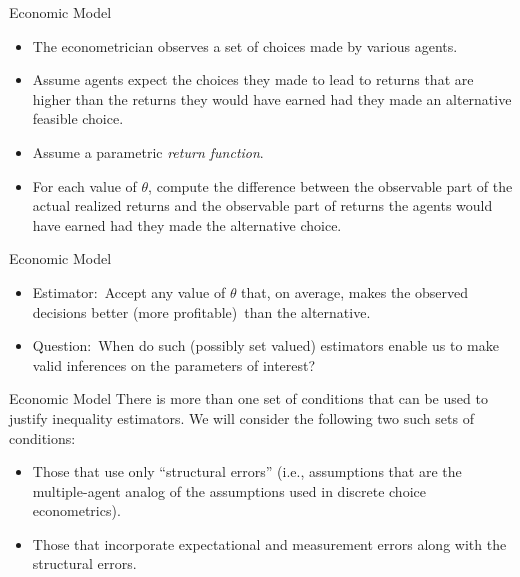 \documentclass[xcolor=pdftex,dvipsnames,table,mathserif]{beamer}
\begin{document}
\begin{frame}{Economic Model}
\begin{itemize}
\item The econometrician observes a set of choices made by various agents.
\vspace{0.1in}
\item Assume agents expect the choices they made to lead to returns that are
higher than the returns they would have earned had they made an
alternative feasible choice.
\vspace{0.1in}
\item Assume a parametric \textit{return function}.
\vspace{0.1in}
\item For each value of $\theta $, compute the difference between the observable part of the actual realized returns and the observable part of returns the agents would have earned had they made the alternative choice.
\end{itemize}
\end{frame}


\begin{frame}{Economic Model}
\begin{itemize}
\item Estimator:\ Accept any value of $\theta $ that, on average, makes the
observed decisions better (more profitable)\ than the alternative.
\vspace{0.1in}
\item Question:\ When do such (possibly set valued) estimators enable us to
make valid inferences on the parameters of interest?
\end{itemize}
\end{frame}


\begin{frame}{Economic Model}
There is more than one set of conditions that can be used to justify
inequality estimators.  We will consider the following two such sets of conditions:\\
\begin{itemize}
\vspace{0.1in}
\item Those that use only ``structural errors'' (i.e., assumptions
that are the multiple-agent analog of the assumptions used in discrete
choice econometrics). \\
\vspace{0.1in}
\item Those that incorporate expectational and measurement errors along with the structural errors.\\
\end{itemize}
\end{frame}
\end{document}
